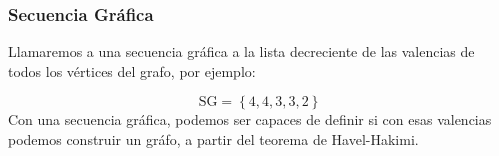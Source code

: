 \subsubsection{Secuencia Gráfica}
Llamaremos a una secuencia gráfica a la lista decreciente de las valencias de todos los vértices del grafo, por ejemplo: \par
{}
\[
        \text{SG} = \left\{4,4,3,3,2\right\}
\]
Con una secuencia gráfica, podemos ser capaces de definir si con esas valencias podemos construir un gráfo, a partir del teorema de Havel-Hakimi.
